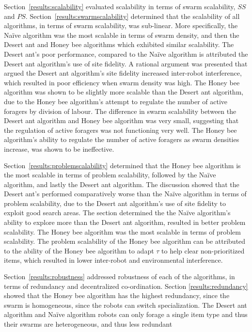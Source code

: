 Section~\ref{results:scalability} evaluated scalability in terms of swarm scalability, $SS$ and $PS$. Section~\ref{results:swarmscalability} determined that the scalability of all algorithms, in terms of swarm scalability, was sub-linear. More specifically, the Na\"ive algorithm was the most scalable in terms of swarm density, and then the Desert ant and Honey bee algorithms which exhibited similar scalability. The Desert ant's poor performance, compared to the Na\"ive algorithm is attributed the Desert ant algorithm's use of site fidelity. A rational argument was presented that argued the Desert ant algorithm's site fidelity increased inter-robot interference, which resulted in poor efficiency when swarm density was high. The Honey bee algorithm was shown to be slightly more scalable than the Desert ant algorithm, due to the Honey bee algorithm's attempt to regulate the number of active foragers by division of labour. The difference in swarm scalability between the Desert ant algorithm and Honey bee algorithm was very small, suggesting that the regulation of active foragers was not functioning very well. The Honey bee algorithm's ability to regulate the number of active foragers as swarm densities increase, was shown to be ineffective. 

Section~\ref{results:problemscalability} determined that the Honey bee algorithm is the most scalable in terms of problem scalability, followed by the Na\"ive algorithm, and lastly the Desert ant algorithm. The discussion showed that the Desert ant's performed comparatively worse than the Na\"ive algorithm in terms of problem scalability, due to the Desert ant algorithm's use of site fidelity to exploit good search areas. The section determined the the Na\"ive algorithm's ability to explore more than the Desert ant algorithm, resulted in better problem scalability. The Honey bee algorithm was the most scalable in terms of problem scalability. The problem scalability of the Honey bee algorithm can be attributed to the ability of the Honey bee algorithm to adapt $\tau$ to help clear non-prioritized items, which resulted in lower inter-robot and environmental interference.

Section~\ref{results:robustness} addressed robustness of each of the algorithms, in terms of redundancy and decentralized co-ordination. Section \ref{results:redundancy} showed that the Honey bee algorithm has the highest redundancy, since the swarm is homogeneous, since the robots can switch specialization. The Desert ant algorithm and Na\"ive algorithm robots can only forage a single item type and thus their swarms are heterogeneous, and thus less redundant

